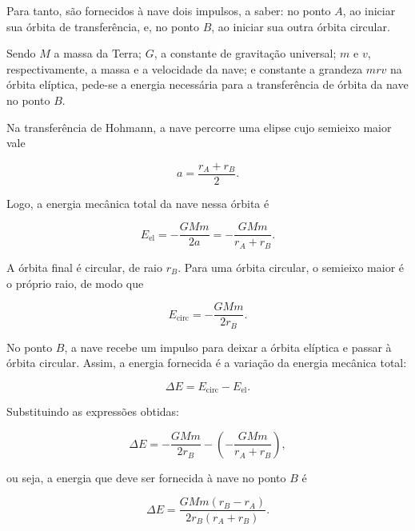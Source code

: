 \begin{exemplo}
\vspace{0.3cm}

Para tanto, são fornecidos à nave dois impulsos, a saber: no ponto $A$, ao iniciar sua órbita de transferência, e, no ponto $B$, ao iniciar sua outra órbita circular.

Sendo $M$ a massa da Terra; $G$, a constante de gravitação universal; $m$ e $v$, respectivamente, a massa e a velocidade da nave; e constante a grandeza $mrv$ na órbita elíptica, pede-se a energia necessária para a transferência de órbita da nave no ponto $B$.


\resolucao

Na transferência de Hohmann, a nave percorre uma elipse cujo semieixo maior vale

\[
a=\frac{r_A+r_B}{2}.
\]

Logo, a energia mecânica total da nave nessa órbita é

\[
E_{\text{el}}=-\frac{GMm}{2a}
=-\frac{GMm}{r_A+r_B}.
\]


A órbita final é circular, de raio $r_B$. Para uma órbita circular, o semieixo maior é o próprio raio, de modo que

\[
E_{\text{circ}}=-\frac{GMm}{2r_B}.
\]


No ponto $B$, a nave recebe um impulso para deixar a órbita elíptica e passar à órbita circular. Assim, a energia fornecida é a variação da energia mecânica total:

\[
\Delta E=E_{\text{circ}}-E_{\text{el}}.
\]

Substituindo as expressões obtidas:

\[
\Delta E
=-\frac{GMm}{2r_B}-\left(-\frac{GMm}{r_A+r_B}\right),
\]

ou seja, a energia que deve ser fornecida à nave no ponto $B$ é

\[
\boxed{
\Delta E=\frac{GMm(r_B-r_A)}{2r_B(r_A+r_B)}.
}
\]


\end{exemplo}


\vspace{0.3cm}






